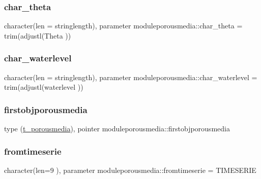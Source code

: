 \subsubsection{\texorpdfstring{char\+\_\+theta}{char\_theta}}
{\footnotesize\ttfamily character(len = stringlength), parameter moduleporousmedia\+::char\+\_\+theta = trim(adjustl(\textquotesingle{}Theta\textquotesingle{} ))\hspace{0.3cm}{\ttfamily [private]}}

\mbox{\label{namespacemoduleporousmedia_a60c5e507d9236adaed3b8caee85cb0ec}} 
\subsubsection{\texorpdfstring{char\+\_\+waterlevel}{char\_waterlevel}}
{\footnotesize\ttfamily character(len = stringlength), parameter moduleporousmedia\+::char\+\_\+waterlevel = trim(adjustl(\textquotesingle{}waterlevel\textquotesingle{} ))\hspace{0.3cm}{\ttfamily [private]}}

\mbox{\label{namespacemoduleporousmedia_adce3f6c3cf611a0ec921e0f59f8564fd}} 
\subsubsection{\texorpdfstring{firstobjporousmedia}{firstobjporousmedia}}
{\footnotesize\ttfamily type (\mbox{\hyperlink{structmoduleporousmedia_1_1t__porousmedia}{t\+\_\+porousmedia}}), pointer moduleporousmedia\+::firstobjporousmedia\hspace{0.3cm}{\ttfamily [private]}}

\mbox{\label{namespacemoduleporousmedia_a9e5f5886dde3038543ba592a0f590876}} 
\subsubsection{\texorpdfstring{fromtimeserie}{fromtimeserie}}
{\footnotesize\ttfamily character(len=9 ), parameter moduleporousmedia\+::fromtimeserie = \textquotesingle{}T\+I\+M\+E\+S\+E\+R\+IE\textquotesingle{}\hspace{0.3cm}{\ttfamily [private]}}

